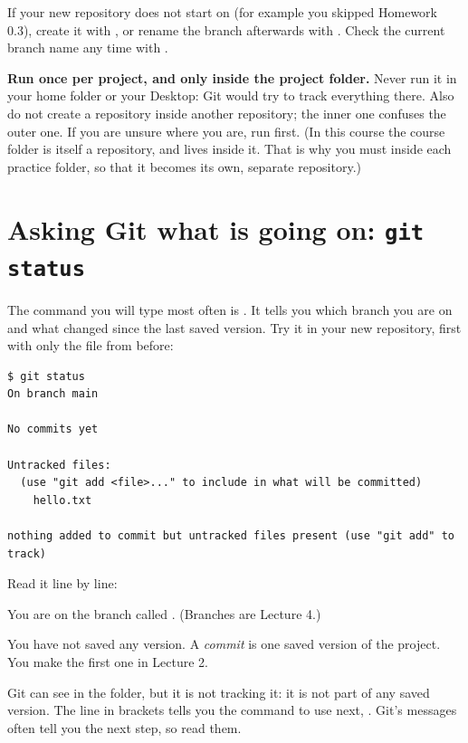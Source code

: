 \begin{quickfact}
If your new repository does not start on  (for example you skipped Homework 0.3), create it with , or rename the branch afterwards with . Check the current branch name any time with .
\end{quickfact}

\begin{pitfall}
\textbf{Run  once per project, and only inside the project folder.} Never run it in your home folder or your Desktop: Git would try to track everything there. Also do not create a repository inside another repository; the inner one confuses the outer one. If you are unsure where you are, run  first. (In this course the course folder is itself a repository, and  lives inside it. That is why you must  inside each practice folder, so that it becomes its own, separate repository.)
\end{pitfall}

\section{Asking Git what is going on: \texttt{git status}}

The command you will type most often is . It tells you which branch you are on and what changed since the last saved version. Try it in your new repository, first with only the file  from before:

\begin{lstlisting}
$ git status
On branch main

No commits yet

Untracked files:
  (use "git add <file>..." to include in what will be committed)
	hello.txt

nothing added to commit but untracked files present (use "git add" to track)
\end{lstlisting}

Read it line by line:
\begin{description}[leftmargin=1.2em,style=nextline]
\item[\code{On branch main}] You are on the branch called . (Branches are Lecture 4.)
\item[\code{No commits yet}] You have not saved any version. A \emph{commit} is one saved version of the project. You make the first one in Lecture 2.
\item[\code{Untracked files}] Git can see  in the folder, but it is not tracking it: it is not part of any saved version. The line in brackets tells you the command to use next, . Git's messages often tell you the next step, so read them.
\end{description}

